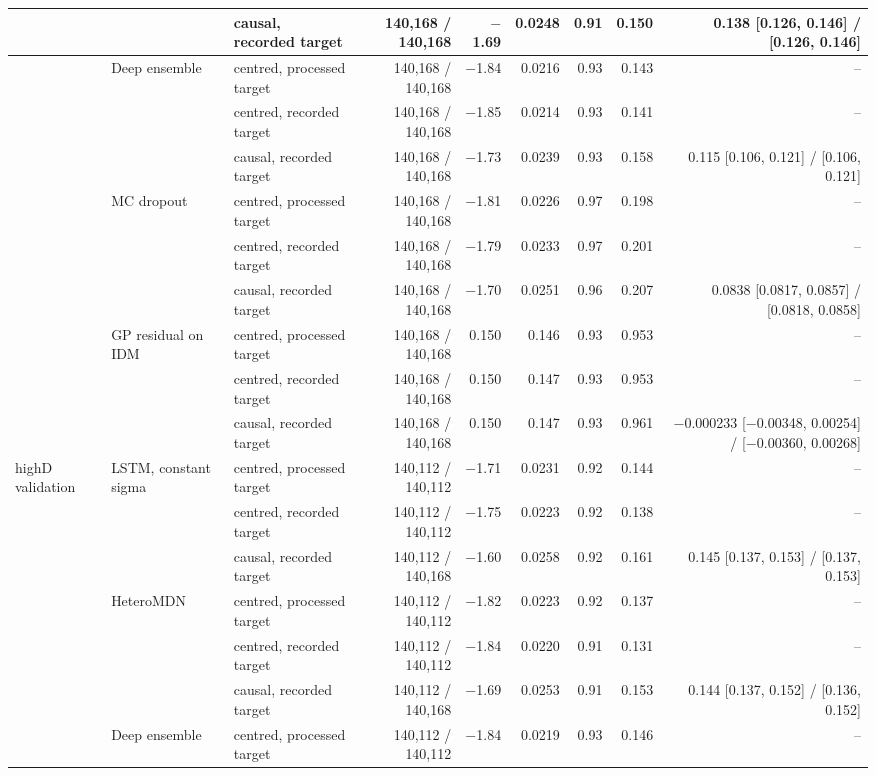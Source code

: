 \begin{longtable}{lllrrrrrr}
 &  & causal, recorded target & 140,168 / 140,168 & $-$1.69 & 0.0248 & 0.91 & 0.150 & 0.138 [0.126, 0.146] / [0.126, 0.146] \\
\midrule
 & Deep ensemble & centred, processed target & 140,168 / 140,168 & $-$1.84 & 0.0216 & 0.93 & 0.143 & -- \\
 &  & centred, recorded target & 140,168 / 140,168 & $-$1.85 & 0.0214 & 0.93 & 0.141 & -- \\
 &  & causal, recorded target & 140,168 / 140,168 & $-$1.73 & 0.0239 & 0.93 & 0.158 & 0.115 [0.106, 0.121] / [0.106, 0.121] \\
\midrule
 & MC dropout & centred, processed target & 140,168 / 140,168 & $-$1.81 & 0.0226 & 0.97 & 0.198 & -- \\
 &  & centred, recorded target & 140,168 / 140,168 & $-$1.79 & 0.0233 & 0.97 & 0.201 & -- \\
 &  & causal, recorded target & 140,168 / 140,168 & $-$1.70 & 0.0251 & 0.96 & 0.207 & 0.0838 [0.0817, 0.0857] / [0.0818, 0.0858] \\
\midrule
 & GP residual on IDM & centred, processed target & 140,168 / 140,168 & 0.150 & 0.146 & 0.93 & 0.953 & -- \\
 &  & centred, recorded target & 140,168 / 140,168 & 0.150 & 0.147 & 0.93 & 0.953 & -- \\
 &  & causal, recorded target & 140,168 / 140,168 & 0.150 & 0.147 & 0.93 & 0.961 & $-$0.000233 [$-$0.00348, 0.00254] / [$-$0.00360, 0.00268] \\
\midrule
highD validation & LSTM, constant sigma & centred, processed target & 140,112 / 140,112 & $-$1.71 & 0.0231 & 0.92 & 0.144 & -- \\
 &  & centred, recorded target & 140,112 / 140,112 & $-$1.75 & 0.0223 & 0.92 & 0.138 & -- \\
 &  & causal, recorded target & 140,112 / 140,168 & $-$1.60 & 0.0258 & 0.92 & 0.161 & 0.145 [0.137, 0.153] / [0.137, 0.153] \\
\midrule
 & HeteroMDN & centred, processed target & 140,112 / 140,112 & $-$1.82 & 0.0223 & 0.92 & 0.137 & -- \\
 &  & centred, recorded target & 140,112 / 140,112 & $-$1.84 & 0.0220 & 0.91 & 0.131 & -- \\
 &  & causal, recorded target & 140,112 / 140,168 & $-$1.69 & 0.0253 & 0.91 & 0.153 & 0.144 [0.137, 0.152] / [0.136, 0.152] \\
\midrule
 & Deep ensemble & centred, processed target & 140,112 / 140,112 & $-$1.84 & 0.0219 & 0.93 & 0.146 & -- \\

\end{longtable}
